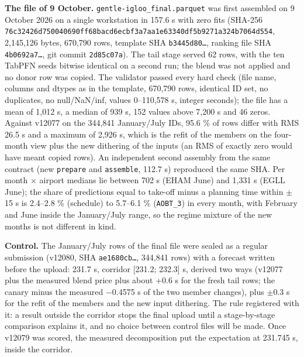 \documentclass[11pt,a4paper]{article}
\begin{document}
\textbf{The file of 9 October.} \texttt{gentle-igloo\_\allowbreak{}final.parquet} was first assembled on 9 October 2026 on a single workstation in 157.6 s with zero fits (SHA-256 \texttt{76c32426d750040690ff68bacd6ecbf3a7aa1e63340df5b9271a324b7064d554}, 2,145,126 bytes, 670,790 rows, template SHA \texttt{b3445d80\ldots{}}, ranking file SHA \texttt{4b0692a7\ldots{}}, git commit \texttt{2d85c07a}). The tail stage served 62 rows, with the ten TabPFN seeds bitwise identical on a second run; the blend was not applied and no donor row was copied. The validator passed every hard check (file name, columns and dtypes as in the template, 670,790 rows, identical ID set, no duplicates, no null/NaN/inf, values 0--110,578 s, integer seconds); the file has a mean of 1,012 s, a median of 939 s, 152 values above 7,200 s and 46 zeros. Against v12077 on the 344,841 January/July IDs, 95.6 \% of rows differ with RMS 26.5 s and a maximum of 2,926 s, which is the refit of the members on the four-month view plus the new dithering of the inputs (an RMS of exactly zero would have meant copied rows). An independent second assembly from the same contract (new \texttt{prepare} and \texttt{assemble}, 112.7 s) reproduced the same SHA. Per month $\times$ airport medians lie between 702 s (EHAM June) and 1,331 s (EGLL June); the share of predictions equal to take-off minus a planning time within $\pm$15 s is 2.4--2.8 \% (schedule) to 5.7--6.1 \% (\texttt{AOBT\_\allowbreak{}3}) in every month, with February and June inside the January/July range, so the regime mixture of the new months is not different in kind.

\textbf{Control.} The January/July rows of the final file were sealed as a regular submission (v12080, SHA \texttt{ae1680cb\ldots{}}, 344,841 rows) with a forecast written before the upload: 231.7 s, corridor {[}231.2; 232.3{]} s, derived two ways (v12077 plus the measured blend price plus about +0.6 s for the fresh tail rows; the canary minus the measured $-$0.4575 s of the two member changes), plus $\pm$0.3 s for the refit of the members and the new input dithering. The rule registered with it: a result outside the corridor stops the final upload until a stage-by-stage comparison explains it, and no choice between control files will be made. Once v12079 was scored, the measured decomposition put the expectation at 231.745 s, inside the corridor.
\end{document}
